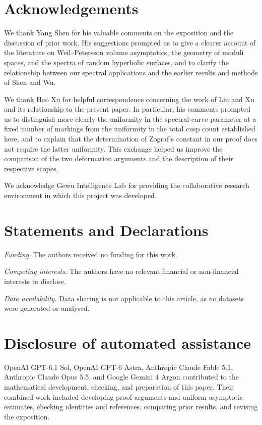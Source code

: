 \section*{Acknowledgements}
We thank Yang Shen for his valuable comments on the exposition and the discussion of prior work. His suggestions prompted us to give a clearer account of the literature on Weil--Petersson volume asymptotics, the geometry of moduli spaces, and the spectra of random hyperbolic surfaces, and to clarify the relationship between our spectral applications and the earlier results and methods of Shen and Wu.

We thank Hao Xu for helpful correspondence concerning the work of Liu and Xu and its relationship to the present paper. In particular, his comments prompted us to distinguish more clearly the uniformity in the spectral-curve parameter at a fixed number of markings from the uniformity in the total cusp count established here, and to explain that the determination of Zograf's constant in our proof does not require the latter uniformity. This exchange helped us improve the comparison of the two deformation arguments and the description of their respective scopes.

We acknowledge Gewu Intelligence Lab for providing the collaborative research environment in which this project was developed.

\section*{Statements and Declarations}
\noindent\textit{Funding.} The authors received no funding for this work.

\noindent\textit{Competing interests.} The authors have no relevant financial or non-financial interests to disclose.

\noindent\textit{Data availability.} Data sharing is not applicable to this article, as no datasets were generated or analysed.

\section*{Disclosure of automated assistance}
OpenAI GPT-6.1 Sol, OpenAI GPT-6 Astra, Anthropic Claude Fable 5.1, Anthropic Claude Opus 5.5, and Google Gemini 4 Argon contributed to the mathematical development, checking, and preparation of this paper. Their combined work included developing proof arguments and uniform asymptotic estimates, checking identities and references, comparing prior results, and revising the exposition.
